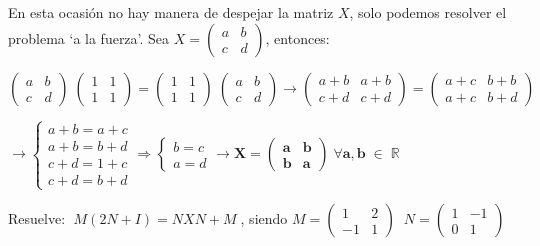 \begin{proofw}\renewcommand{\qedsymbol}{$\diamond$}
	En esta ocasión no hay manera de despejar la matriz $X$, solo podemos resolver el problema `a la fuerza'. Sea $X=\left( \begin{matrix}  a&b\\c&d \end{matrix} \right)$, entonces:

\noindent $ \left( \begin{matrix}  a&b\\c&d \end{matrix} \right)\;\left( \begin{matrix} 1&1\\1&1 \end{matrix} \right)=\left( \begin{matrix}  1&1\\1&1  \end{matrix} \right)\;\left( \begin{matrix}  a&b\\c&d \end{matrix} \right)  \to  
\left( \begin{matrix} a+b&a+b\\ c+d&c+d\end{matrix} \right) 
=
\left( \begin{matrix} a+c&b+b \\a+c&b+d \end{matrix} \right)$

\noindent $\to \begin{cases}
 a+b=a+c\\a+b=b+d\\c+d=1+c\\c+d=b+d	
 \end{cases}  \Rightarrow \begin{cases}
 b=c \\ a=d	
 \end{cases} \to \boldsymbol{X=\left( \begin{matrix} a&b\\b&a  \end{matrix} \right)\; \forall a,b\; \in \; \mathbb R} $
\end{proofw}

\begin{ejre}
 Resuelve: $\; M(2N+I)=NXN+M\; $, siendo $M= \left( \begin{matrix}  1&2\\-1&1\end{matrix} \right)\; \; N= \left( \begin{matrix}1&-1\\0&1  \end{matrix} \right)$
\end{ejre}

